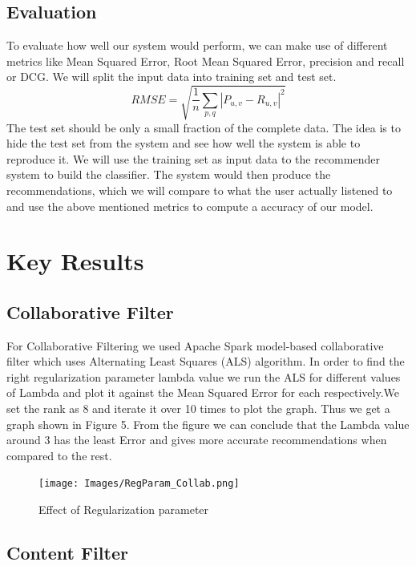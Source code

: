 \documentclass{sig-alternate-05-2015}
\begin{document}
\subsection{Evaluation}
To evaluate how well our system would perform, we can make use of different metrics like Mean Squared Error, Root Mean Squared Error, precision and recall or DCG. We will split the input data into training set and test set. \\
\begin{equation*}
    RMSE = \sqrt{\frac{1}{n}\sum_{p,q}|{P_{u,v}}- {R_{u,v}}|^2}
\end{equation*}
The test set should be only a small fraction of the complete data. The idea is to hide the test set from the system and see how well the system is able to reproduce it. We will use the training set as input data to the recommender system to build the classifier. The system would then produce the recommendations, which we will compare to what the user actually listened to and use the above mentioned metrics to compute a accuracy of our model.

\section{Key Results}
\subsection{Collaborative Filter}
  For Collaborative Filtering we used Apache Spark model-based collaborative filter which uses Alternating Least Squares (ALS) algorithm. In order to find the right regularization parameter lambda value we run the ALS for different values of Lambda and plot it against the Mean Squared Error for each respectively.We set the rank as 8 and iterate it over 10 times to plot the graph. Thus we get a graph shown in Figure 5. From the figure we can conclude that the Lambda value around 3 has the least Error and gives more accurate recommendations when compared to the rest.
  
\begin{figure}[h]
    \centering
    \texttt{[image: Images/RegParam\_Collab.png]}
    \caption{Effect of Regularization parameter}
\end{figure}

\subsection{Content Filter}
\end{document}
